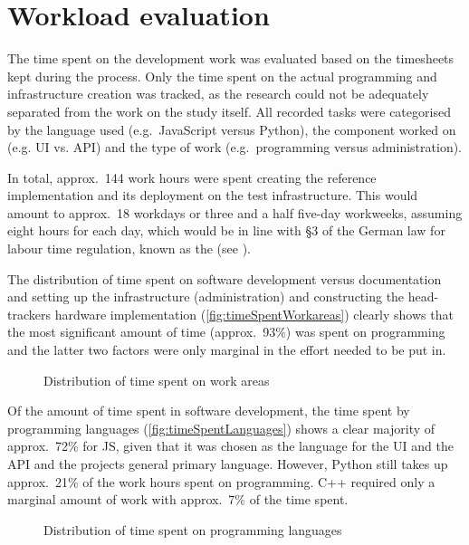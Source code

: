 \section{Workload evaluation}\label{sec:workload-evaluation}

The time spent on the development work was evaluated based on the timesheets kept during the process.
Only the time spent on the actual programming and infrastructure creation was tracked, as the research could not be adequately separated from the work on the study itself.
All recorded tasks were categorised by the language used (e.g.\ JavaScript versus Python), the component worked on (e.g. \ac{UI} vs. \ac{API}) and the type of work (e.g.\ programming versus administration).

In total, approx.~144 work hours were spent creating the reference implementation and its deployment on the test infrastructure.
This would amount to approx.~18 workdays or three and a half five-day workweeks, assuming eight hours for each day, which would be in line with §3 of the German law for labour time regulation, known as the  (see \parencite{abzgPar3}).

The distribution of time spent on software development versus documentation and setting up the infrastructure (administration) and constructing the head-tracker\textquotesingle s hardware implementation (\autoref{fig:timeSpentWorkareas}) clearly shows that the most significant amount of time (approx.~93\%) was spent on programming and the latter two factors were only marginal in the effort needed to be put in.

\begin{figure*}[!ht]
\centering

\caption[Time spent by work area]{Distribution of time spent on work areas\protect}
\label{fig:timeSpentWorkareas}
\end{figure*}

Of the amount of time spent in software development, the time spent by programming languages (\autoref{fig:timeSpentLanguages}) shows a clear majority of approx.~72\% for \ac{JS}, given that it was chosen as the language for the \ac{UI} and the \ac{API} and the project\textquotesingle s general primary language.
However, Python still takes up approx.~21\% of the work hours spent on programming.
C++ required only a marginal amount of work with approx.~7\% of the time spent.

\begin{figure*}[!ht]
\centering
\hfill
\caption[Time spent by programming language]{Distribution of time spent on programming languages\protect}
\label{fig:timeSpentLanguages}
\end{figure*}

